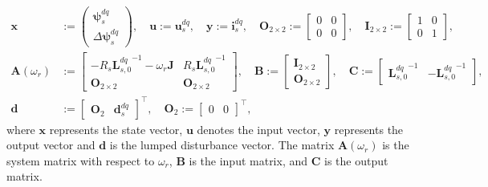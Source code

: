 \begin{equation*}
\begin{aligned}
\mathbf{x} &:= \begin{pmatrix} \bm{\psi}^{dq}_s \\ \Delta{\boldsymbol{\psi}^{dq}_s} \end{pmatrix}, \quad \mathbf{u} := \mathbf{u}^{dq}_s, \quad \mathbf{y} := \mathbf{i}^{dq}_s, \quad \mathbf{O}_{2\times2} := \begin{bmatrix}
0  & 0\\
0 & 0
\end{bmatrix}, \quad \mathbf{I}_{2\times2} := \begin{bmatrix}
1  & 0\\
0 & 1
\end{bmatrix}, \\
\mathbf{A}(\omega_r) &:= \begin{bmatrix}
-R_s {\mathbf{L}^{dq}_{s,0}}^{-1}-\omega_r \mathbf{J}  & R_s {\mathbf{L}^{dq}_{s,0}}^{-1}\\
\mathbf{O}_{2\times2} & \mathbf{O}_{2\times2}
\end{bmatrix}, \quad \mathbf{B} := \begin{bmatrix}
\mathbf{I}_{2\times2} \\
\mathbf{O}_{2\times2}
\end{bmatrix}, \quad \mathbf{C} := \begin{bmatrix}
{\mathbf{L}^{dq}_{s,0}}^{-1} & -{\mathbf{L}^{dq}_{s,0}}^{-1}
\end{bmatrix}, \\
\mathbf{d} &:= \begin{bmatrix}
    \mathbf{O}_2 & \mathbf{d}^{dq}_s
\end{bmatrix}^\top, \quad \mathbf{O}_2 := \begin{bmatrix}
    0 & 0
\end{bmatrix}^\top,
\end{aligned}
\end{equation*}
where $\mathbf{x}$ represents the state vector, $\mathbf{u}$ denotes the input vector, $\mathbf{y}$ represents the output vector and $\mathbf{d}$ is the lumped disturbance vector. The matrix $\mathbf{A}(\omega_r)$ is the system matrix with respect to $\omega_r$, $\mathbf{B}$ is the input matrix, and $\mathbf{C}$ is the output matrix. 

